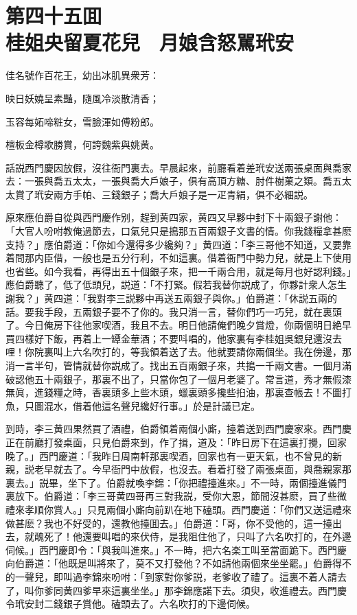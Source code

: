
\chapter*{第四十五囬　\\桂姐央留夏花兒　月娘含怒駡玳安}


\begin{myquote}
佳名號作百花王，幼出冰肌異衆芳：

映日妖嬈呈素豔，隨風冷淡散清香；

玉容每妬啼粧女，雪臉渾如傅粉郎。

檀板金樽歌勝賞，何誇魏紫與姚黄。
\end{myquote}

話説西門慶因放假，沒往衙門裏去。早晨起來，前廳看着差玳安送兩張桌面與喬家去：一張與喬五太太，一張與喬大戶娘子，俱有高頂方糖、肘件樹菓之類。喬五太太賞了玳安兩方手帕、三錢銀子；喬大戶娘子是一疋青絹，俱不必細説。

原來應伯爵自從與西門慶作别，趕到黄四家，黄四又早夥中封下十兩銀子謝他：「大官人吩咐教俺過節去，口氣兒只是搗那五百兩銀子文書的情。你我錢糧拿甚麽支持？」應伯爵道：「你如今還得多少纔夠？」黄四道：「李三哥他不知道，又要靠着問那内臣借，一般也是五分行利，不如這裏。借着衙門中勢力兒，就是上下使用也省些。如今我看，再得出五十個銀子來，把一千兩合用，就是每月也好認利錢。」應伯爵聽了，低了低頭兒，説道：「不打緊。假若我替你説成了，你夥計衆人怎生謝我？」黄四道：「我對李三説夥中再送五兩銀子與你。」伯爵道：「休説五兩的話。要我手段，五兩銀子要不了你的。我只消一言，替你們巧一巧兒，就在裏頭了。今日俺房下往他家喫酒，我且不去。明日他請俺們晚夕賞燈，你兩個明日絶早買四樣好下飯，再着上一罈金華酒；不要呌唱的，他家裏有李桂姐吳銀兒還沒去哩！你院裏叫上六名吹打的，等我領着送了去。他就要請你兩個坐。我在傍邊，那消一言半句，管情就替你説成了。找出五百兩銀子來，共搗一千兩文書。一個月滿破認他五十兩銀子，那裏不出了，只當你包了一個月老婆了。常言道，秀才無假漆無眞，進錢糧之時，香裏頭多上些木頭，蠟裏頭多攙些㧮油，那裏查帳去！不圖打魚，只圖混水，借着他這名聲兒纔好行事。」於是計議已定。

到時，李三黄四果然買了酒禮，伯爵領着兩個小廝，擡着送到西門慶家來。西門慶正在前廳打發桌面，只見伯爵來到，作了揖，道及：「昨日房下在這裏打攪，回家晚了。」西門慶道：「我昨日周南軒那裏喫酒，回家也有一更天氣，也不曾見的新親，説老早就去了。今早衙門中放假，也沒去。看着打發了兩張桌面，與喬親家那裏去。」説畢，坐下了。伯爵就喚李錦：「你把禮擡進來。」不一時，兩個擡進儀門裏放下。伯爵道：「李三哥黄四哥再三對我説，受你大恩，節間沒甚麽，買了些微禮來孝順你賞人。」只見兩個小廝向前趴在地下磕頭。西門慶道：「你們又送這禮來做甚麽？我也不好受的，還教他擡囬去。」伯爵道：「哥，你不受他的，這一擡出去，就醜死了！他還要叫唱的來伏侍，是我阻住他了，只叫了六名吹打的，在外邊伺候。」西門慶即令：「與我叫進來。」不一時，把六名楽工叫至當面跪下。西門慶向伯爵道：「他既是叫將來了，莫不又打發他？不如請他兩個來坐坐罷。」伯爵得不的一聲兒，即叫過李錦來吩咐：「到家對你爹説，老爹收了禮了。這裏不着人請去了，叫你爹同黄四爹早來這裏坐坐。」那李錦應諾下去。須臾，收進禮去。西門慶令玳安封二錢銀子賞他。磕頭去了。六名吹打的下邊伺候。

